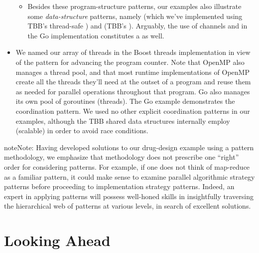 \documentclass[letterpaper,10pt,openany,oneside]{sphinxmanual}
\begin{document}
\begin{itemize}
\begin{itemize}
\item {} 
Besides these program-structure patterns, our examples also illustrate some \emph{data-structure} patterns, namely  (which we’ve implemented using TBB’s thread-safe ) and  (TBB’s ). Arguably, the use of channels  and  in the Go implementation constitutes a  as well.

\end{itemize}

\item {} 
We named our array of threads  in the Boost threads implementation in view of the  pattern for advancing the program counter. Note that OpenMP also manages a thread pool, and that most runtime implementations of OpenMP create all the threads they’ll need at the outset of a program and reuse them as needed for parallel operations throughout that program. Go also manages its own pool of goroutines (threads). The Go example demonstrates the  coordination pattern. We used no other explicit coordination patterns in our examples, although the TBB shared data structures internally employ (scalable)  in order to avoid race conditions.

\end{itemize}

\begin{notice}{note}{Note:}
Having developed solutions to our drug-design example using a pattern methodology, we emphasize that methodology does not prescribe one “right” order for considering patterns. For example, if one does not think of map-reduce as a familiar pattern, it could make sense to examine parallel algorithmic strategy patterns before proceeding to implementation strategy patterns. Indeed, an expert in applying patterns will possess well-honed skills in insightfully traversing the hierarchical web of patterns at various levels, in search of excellent solutions.
\end{notice}


\section{Looking Ahead}
\label{lookingahead/lookingahead::doc}\label{lookingahead/lookingahead:looking-ahead}
\end{document}
